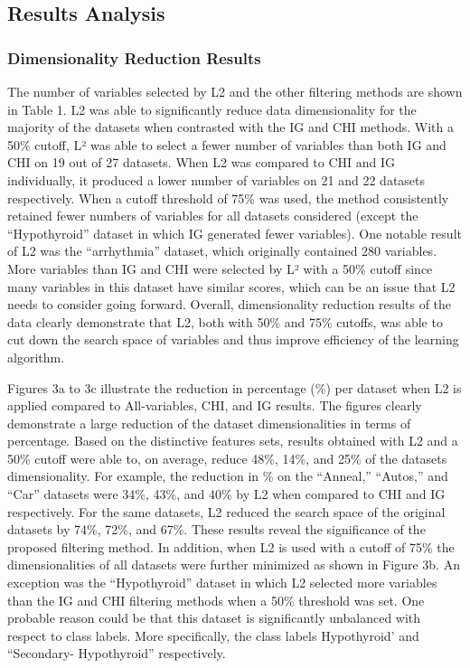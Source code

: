 \documentclass[review]{elsarticle}
\begin{document}
\subsection{Results Analysis }

\subsubsection{Dimensionality Reduction Results }

The number of variables selected by L2 and the other filtering methods are shown in Table 1. L2 was able to significantly reduce data dimensionality for the majority of the datasets when contrasted with the IG and CHI methods. With a 50\% cutoff, L² was able to select a fewer number of variables than both IG and CHI on 19 out of 27 datasets. When L2 was compared to CHI and IG individually, it produced a lower number of variables on 21 and 22 datasets respectively. When a cutoff threshold of 75\% was used, the method consistently retained fewer numbers of variables for all datasets considered (except the “Hypothyroid” dataset in which IG generated fewer variables). One notable result of L2 was the “arrhythmia” dataset, which originally contained 280 variables. More variables than IG and CHI were selected by L² with a 50\% cutoff since many variables in this dataset have similar scores, which can be an issue that L2 needs to consider going forward. Overall, dimensionality reduction results of the data clearly demonstrate that L2, both with 50\% and 75\% cutoffs, was able to cut down the search space of variables and thus improve efficiency of the learning algorithm.

Figures 3a to 3c illustrate the reduction in percentage (\%) per dataset when L2 is applied compared to All-variables, CHI, and IG results. The figures clearly demonstrate a large reduction of the dataset dimensionalities in terms of percentage. Based on the distinctive features sets, results obtained with L2 and a 50\% cutoff were able to, on average, reduce 48\%, 14\%, and 25\% of the datasets dimensionality. For example, the reduction in \% on the “Anneal,” “Autos,” and “Car” datasets were 34\%, 43\%, and 40\% by L2 when compared to CHI and IG respectively. For the same datasets, L2 reduced the search space of the original datasets by 74\%, 72\%, and 67\%. These results reveal the significance of the proposed filtering method. In addition, when L2 is used with a cutoff of 75\% the dimensionalities of all datasets were further minimized as shown in Figure 3b.  An exception was the “Hypothyroid” dataset in which L2 selected more variables than the IG and CHI filtering methods when a 50\% threshold was set. One probable reason could be that this dataset is significantly unbalanced with respect to class labels. More specifically, the class labels Hypothyroid’ and “Secondary- Hypothyroid” respectively. 
\end{document}
